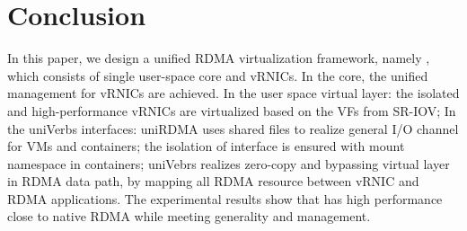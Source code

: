 \section{Conclusion}
In this paper, we design a unified RDMA virtualization framework, namely \sys, which consists of single user-space \sys core and vRNICs. In the \sys core, the unified management for vRNICs are achieved. In the user space virtual layer: the isolated and high-performance vRNICs are virtualized based on the VFs from SR-IOV; In the uniVerbs interfaces: uniRDMA uses shared files to realize general I/O channel for VMs and containers; the isolation of interface is ensured with mount namespace in containers; uniVebrs realizes zero-copy and bypassing virtual layer in RDMA data path, by mapping all RDMA resource between vRNIC and RDMA applications. The experimental results show that \sys has high performance close to native RDMA while meeting generality and management.
